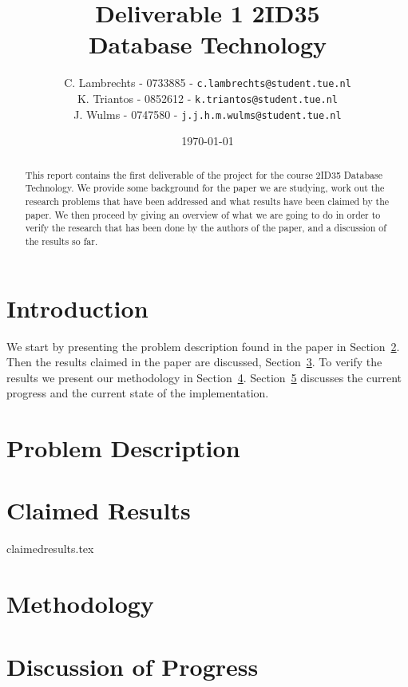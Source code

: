 \documentclass[a4paper,twoside,11pt]{article}
\title{\vspace{-\baselineskip}\sffamily\bfseries Deliverable 1 2ID35 \\ Database Technology }
\author{
C. Lambrechts - 0733885 - {\tt c.lambrechts@student.tue.nl} \\
K. Triantos - 0852612 - {\tt k.triantos@student.tue.nl}\\
J. Wulms - 0747580 - {\tt j.j.h.m.wulms@student.tue.nl}\\
}
\date{\today}
\numberwithin{equation}{section}
\begin{document}
\maketitle
\thispagestyle{empty}
\begin{abstract}
This report contains the first deliverable of the project for the course 2ID35 Database Technology. We provide some background for the paper we are studying, work out the research problems that have been addressed and what results have been claimed by the paper. We then proceed by giving an overview of what we are going to do in order to verify the research that has been done by the authors of the paper, and a discussion of the results so far.
\end{abstract}

\section{Introduction} \label{sec:Introduction}


We start by presenting the problem description found in the paper in Section~\ref{sec:ProblemDescription}. Then the results claimed in the paper are discussed, Section~\ref{sec:ClaimedResults}. To verify the results we present our methodology in Section~\ref{sec:Methodology}. Section~\ref{sec:Discussion} discusses the current progress and the current state of the implementation.

\section{Problem Description} \label{sec:ProblemDescription}


\section{Claimed Results} \label{sec:ClaimedResults}
 {claimedresults.tex}

\section{Methodology} \label{sec:Methodology}


\section{Discussion of Progress} \label{sec:Discussion}


%


\end{document}
